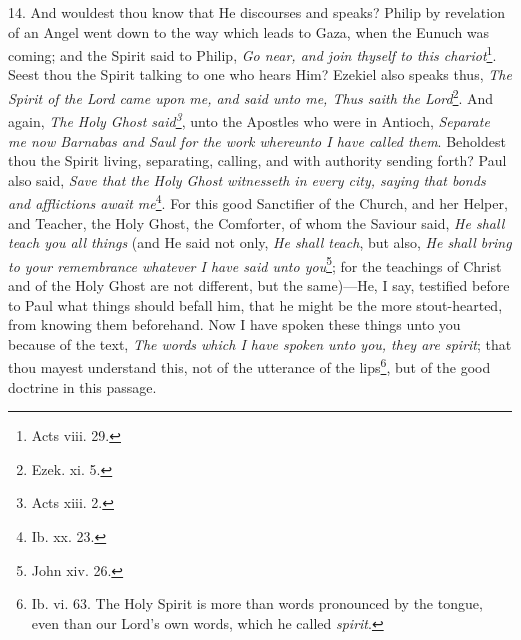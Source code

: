 14. And wouldest thou know that He discourses and speaks? Philip by revelation of an Angel went down to the way which leads to Gaza, when the Eunuch was coming; and the Spirit said to Philip, \emph{Go near, and join thyself to this chariot}\footnote{Acts viii. 29.}. Seest thou the Spirit talking to one who hears Him? Ezekiel also speaks thus, \emph{The Spirit of the Lord came upon me, and said unto me, Thus saith the Lord}\footnote{Ezek. xi. 5.}. And again, \emph{The Holy Ghost said\footnote{Acts xiii. 2.}}, unto the Apostles who were in Antioch, \emph{Separate me now Barnabas and Saul for the work whereunto I have called them}. Beholdest thou the Spirit living, separating, calling, and with authority sending forth? Paul also said, \emph{Save that the Holy Ghost witnesseth in every city, saying that bonds and afflictions await me}\footnote{Ib. xx. 23.}. For this good Sanctifier of the Church, and her Helper, and Teacher, the Holy Ghost, the Comforter, of whom the Saviour said, \emph{He shall} \emph{teach you all things} (and He said not only, \emph{He shall teach}, but also, \emph{He shall bring to your remembrance whatever I have said unto you}\footnote{John xiv. 26.}; for the teachings of Christ and of the Holy Ghost are not different, but the same)—He, I say, testified before to Paul what things should befall him, that he might be the more stout-hearted, from knowing them beforehand. Now I have spoken these things unto you because of the text, \emph{The words which I have spoken unto you, they are spirit}; that thou mayest understand this, not of the utterance of the lips\footnote{Ib. vi. 63. The Holy Spirit is more than words pronounced by the tongue, even than our Lord’s own words, which he called \emph{spirit}.}, but of the good doctrine in this passage.

